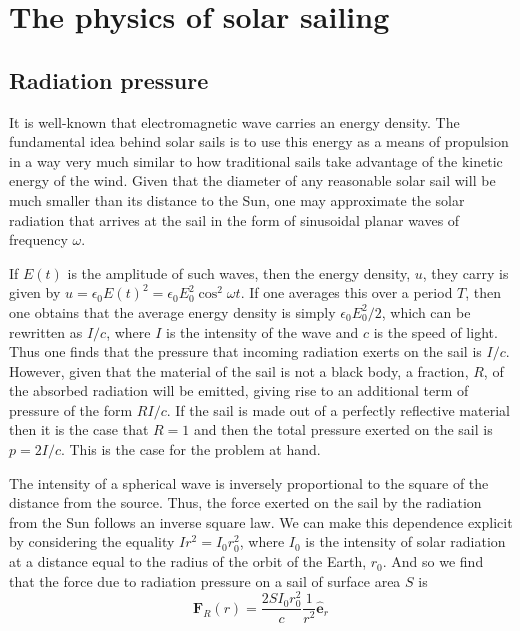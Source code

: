 \documentclass[twocolumn,12pt,a4paper]{article}
\numberwithin{equation}{section}
\begin{document}
\section{The physics of solar sailing}
\subsection{Radiation pressure}
It is well-known that electromagnetic wave carries an energy density. The fundamental idea behind solar sails is to use this energy as a means of propulsion in a way very much similar to how traditional sails take advantage of the kinetic energy of the wind. Given that the diameter of any reasonable solar sail will be much smaller than its distance to the Sun, one may approximate the solar radiation that arrives at the sail in the form of sinusoidal planar waves of frequency \( \omega \).

If \( E(t) \) is the amplitude of such waves, then the energy density, \( u \), they carry is given by \( u = \epsilon_0 E(t)^2 = \epsilon_0 E_0^2 \cos^2{\omega t} \). If one averages this over a period \( T \), then one obtains that the average energy density is simply \( \epsilon_0 E_0^2 /2 \), which can be rewritten as \( I/c \), where \( I \) is the intensity of the wave and \( c \) is the speed of light. Thus one finds that the pressure that incoming radiation exerts on the sail is \( I/c \). However, given that the material of the sail is not a black body, a fraction, \( R \), of the absorbed radiation will be emitted, giving rise to an additional term of pressure of the form \( RI/c \). If the sail is made out of a perfectly reflective material then it is the case that \( R = 1 \) and then the total pressure exerted on the sail is \( p = 2I/c \). This is the case for the problem at hand.

The intensity of a spherical wave is inversely proportional to the square of the distance from the source. Thus, the force exerted on the sail by the radiation from the Sun follows an inverse square law. We can make this dependence explicit by considering the equality \( Ir^2 = I_0 r^2_0 \), where \( I_0 \) is the intensity of solar radiation at a distance equal to the radius of the orbit of the Earth, \( r_0 \). And so we find that the force due to radiation pressure on a sail of surface area \( S \) is
\begin{equation}
 	\mathbf{F}_R(r) = \dfrac{2SI_0r_0^2}{c}\dfrac{1}{r^2} \mathbf{\hat{e}}_r \label{eq:radiation force}
\end{equation}
\end{document}
